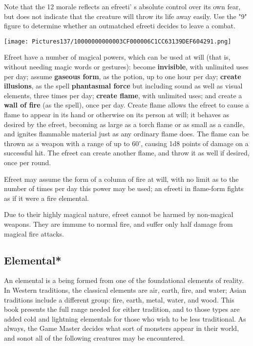 \documentclass[a4paper,twoside,openany,10pt]{book}
\begin{document}
\begin{multicols}{2}
Note that the 12 morale reflects an efreeti' s absolute control over its own fear, but does not indicate that the creature will throw its life away easily. Use the "9" figure to determine whether an outmatched efreeti decides to leave a combat.


\begin{center}
	\texttt{[image: Pictures137/10000000000003CF000006C1CC63139DEF604291.png]}
\end{center}

Efreet have a number of magical powers, which can be used at will (that is, without needing magic words or gestures): become \textbf{invisible}, with unlimited uses per day; assume \textbf{gaseous form}, as the potion, up to one hour per day; \textbf{create illusions}, as the spell \textbf{phantasmal force} but including sound as well as visual elements, three times per day; \textbf{create flame}, with unlimited uses; and create a \textbf{wall of fire }(as the spell), once per day. Create flame allows the efreet to cause a flame to appear in its hand or otherwise on its person at will; it behaves as desired by the efreet, becoming as large as a torch flame or as small as a candle, and ignites flammable material just as any ordinary flame does. The flame can be thrown as a weapon with a range of up to 60', causing 1d8 points of damage on a successful hit. The efreet can create another flame, and throw it as well if desired, once per round.

Efreet may assume the form of a column of fire at will, with no limit as to the number of times per day this power may be used; an efreeti in flame-form fights as if it were a fire elemental.

Due to their highly magical nature, efreet cannot be harmed by non-magical weapons. They are immune to normal fire, and suffer only half damage from magical fire attacks.


\subsection*{Elemental*}\label{elemental}

An elemental is a being formed from one of the foundational elements of reality. In Western traditions, the classical elements are air, earth, fire, and water; Asian traditions include a different group: fire, earth, metal, water, and wood. This book presents the full range needed for either tradition, and to those types are added cold and lightning elementals for those who wish to be less traditional. As always, the Game Master decides what sort of monsters appear in their world, and sonot all of the following creatures may be encountered.


\end{multicols}
\end{document}

